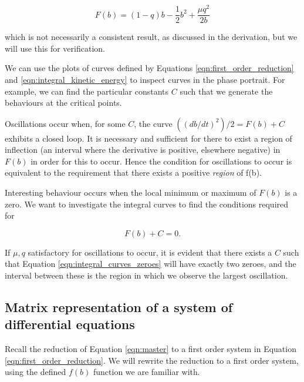 \documentclass{article}
\begin{document}
\begin{equation}
    F(b) = (1-q)b - \frac{1}{2}b^2 + \frac{\mu q^2}{2b}
    \label{eqn:integral_curve_supposed}
\end{equation}

which is not necessarily a consistent result, as discussed in the derivation, but we will use this for verification.

We can use the plots of curves defined by Equations \ref{eqn:first_order_reduction} and \ref{eqn:integral_kinetic_energy} to inspect curves in the phase portrait.
For example, we can find the particular constants $C$ such that we generate the behaviours at the critical points.


Oscillations occur when, for some $C$, the curve $\left((db/dt)^2\right)/2 = F(b) + C$ exhibits a closed loop.
It is necessary and sufficient for there to exist a region of inflection (an interval where the derivative is positive,
elsewhere negative) in $F(b)$ in order for this to occur.
Hence the condition for oscillations to occur is equivalent to the requirement that there exists a positive \textit{region} of f(b).

Interesting behaviour occurs when the local minimum or maximum of $F(b)$ is a zero.
We want to investigate the integral curves to find the conditions required for

\begin{equation}
	F(b) + C = 0.
	\label{eqn:integral_curves_zeroes}
\end{equation}

If $\mu, q$ satisfactory for oscillations to occur,
it is evident that there exists a $C$ such that Equation \ref{eqn:integral_curves_zeroes} will have exactly two zeroes,
and the interval between these is the region in which we observe the largest oscillation.

\subsection{Matrix representation of a system of differential equations}

Recall the reduction of Equation \ref{eqn:master} to a first order system in Equation \ref{eqn:first_order_reduction}.
We will rewrite the reduction to a first order system, using the defined $f(b)$ function we are familiar with.
\end{document}
